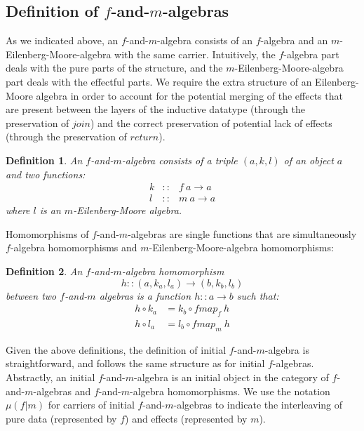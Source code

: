 \documentclass{jfp1}
\newtheorem{definition}{Definition}
\begin{document}
\subsection{Definition of \texorpdfstring{$f$}{f}-and-\texorpdfstring{$m$}{m}-algebras}

As we indicated above, an $f$-and-$m$-algebra consists of an
$f$-algebra and an $m$-Eilenberg-Moore-algebra with the same
carrier. Intuitively, the $f$-algebra part deals with the pure parts
of the structure, and the $m$-Eilenberg-Moore-algebra part deals with
the effectful parts. We require the extra structure of an
Eilenberg-Moore algebra in order to account for the potential merging
of the effects that are present between the layers of the inductive
datatype (through the preservation of $\mathit{join}$) and the correct
preservation of potential lack of effects (through the preservation of
$\mathit{return}$).

\begin{definition}
  An \emph{$f$-and-$m$-algebra} consists of a triple
  $(a,k,l)$ of an object $a$ and two
  functions:
  \begin{displaymath}
    \begin{array}{rcl}
      k & :: & f~a \to a \\
      l & :: & m~a \to a
    \end{array}
  \end{displaymath}
  where $l$ is an $m$-Eilenberg-Moore algebra.
\end{definition}

Homomorphisms of $f$-and-$m$-algebras are single functions that are
simultaneously $f$-algebra homomorphisms and
$m$-Eilenberg-Moore-algebra homomorphisms:

\begin{definition}
  An \emph{$f$-and-$m$-algebra homomorphism}
  \begin{displaymath}
    h :: (a, k_a, l_a) \to (b, k_b, l_b)
  \end{displaymath}
  between two $f$-and-$m$ algebras is a function $h :: a \to b$ such
  that:
  \begin{align}
    \label{eq:fm-alg-hom1}
    h \circ k_a & = k_b \circ \mathit{fmap}_f~h \\
    \label{eq:fm-alg-hom2}
    h \circ l_a & = l_b \circ \mathit{fmap}_m~h
  \end{align}
\end{definition}

Given the above definitions, the definition of initial
$f$-and-$m$-algebra is straightforward, and follows the same
structure as for initial $f$-algebras. Abstractly, an initial
$f$-and-$m$-algebra is an initial object in the category of
$f$-and-$m$-algebras and $f$-and-$m$-algebra homomorphisms. We use the
notation $\mu(f|m)$ for carriers of initial $f$-and-$m$-algebras to
indicate the interleaving of pure data (represented by $f$) and
effects (represented by $m$).
\end{document}
